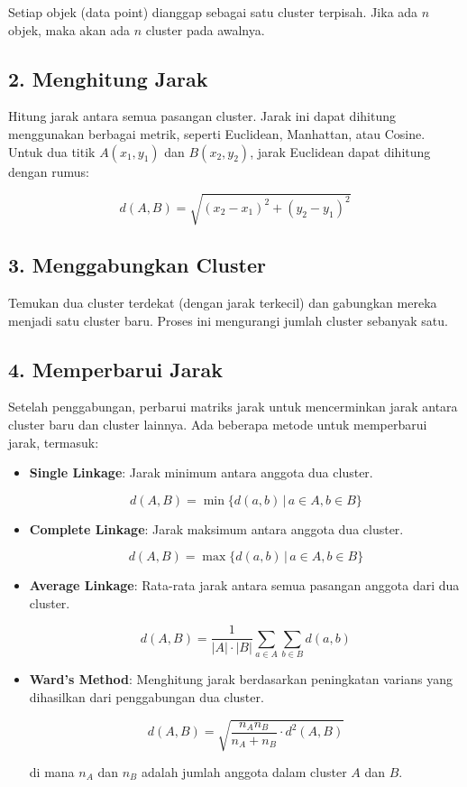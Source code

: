 \documentclass[
  oneside]{book}
\begin{document}
Setiap objek (data point) dianggap sebagai satu cluster terpisah. Jika ada \(n\) objek, maka akan ada \(n\) cluster pada awalnya.

\subsection*{2. Menghitung Jarak}\label{menghitung-jarak}

Hitung jarak antara semua pasangan cluster. Jarak ini dapat dihitung menggunakan berbagai metrik, seperti Euclidean, Manhattan, atau Cosine. Untuk dua titik \(A(x_1, y_1)\) dan \(B(x_2, y_2)\), jarak Euclidean dapat dihitung dengan rumus:

\[
d(A, B) = \sqrt{(x_2 - x_1)^2 + (y_2 - y_1)^2}
\]

\subsection*{3. Menggabungkan Cluster}\label{menggabungkan-cluster}

Temukan dua cluster terdekat (dengan jarak terkecil) dan gabungkan mereka menjadi satu cluster baru. Proses ini mengurangi jumlah cluster sebanyak satu.

\subsection*{4. Memperbarui Jarak}\label{memperbarui-jarak}

Setelah penggabungan, perbarui matriks jarak untuk mencerminkan jarak antara cluster baru dan cluster lainnya. Ada beberapa metode untuk memperbarui jarak, termasuk:

\begin{itemize}
\item
  \textbf{Single Linkage}: Jarak minimum antara anggota dua cluster.

  \[
  d(A, B) = \min \{ d(a, b) \,|\, a \in A, b \in B \}
  \]
\item
  \textbf{Complete Linkage}: Jarak maksimum antara anggota dua cluster.

  \[
  d(A, B) = \max \{ d(a, b) \,|\, a \in A, b \in B \}
  \]
\item
  \textbf{Average Linkage}: Rata-rata jarak antara semua pasangan anggota dari dua cluster.

  \[
  d(A, B) = \frac{1}{|A| \cdot |B|} \sum_{a \in A} \sum_{b \in B} d(a, b)
  \]
\item
  \textbf{Ward's Method}: Menghitung jarak berdasarkan peningkatan varians yang dihasilkan dari penggabungan dua cluster.

  \[
  d(A, B) = \sqrt{\frac{n_A n_B}{n_A + n_B} \cdot d^2(A, B)}
  \]

  di mana \(n_A\) dan \(n_B\) adalah jumlah anggota dalam cluster \(A\) dan \(B\).
\end{itemize}
\end{document}
